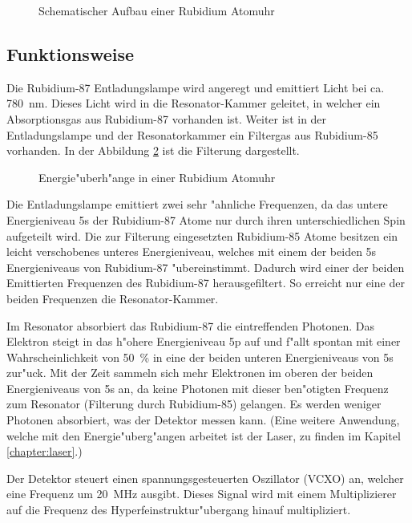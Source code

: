 \begin{refsection}
\begin{figure}
  \centering
  
  \caption{Schematischer Aufbau einer Rubidium Atomuhr}
  \label{fig:techBlock}
\end{figure}

\subsection{Funktionsweise}
Die Rubidium-87 Entladungslampe wird angeregt und emittiert Licht bei
ca. \SI{780}{\nano\meter}.  Dieses Licht wird in die Resonator-Kammer
geleitet, in welcher ein Absorptionsgas aus Rubidium-87 vorhanden ist.
Weiter ist in der Entladungslampe und der Resonatorkammer ein
Filtergas aus Rubidium-85 vorhanden.  In der Abbildung
\ref{fig:uebergaenge} ist die Filterung dargestellt.

\begin{figure}
  \centering
  
  \caption{Energie"uberh"ange in einer Rubidium Atomuhr}
  \label{fig:uebergaenge}
\end{figure}

Die Entladungslampe emittiert zwei sehr "ahnliche Frequenzen, da das
untere Energieniveau 5s der Rubidium-87 Atome nur durch ihren
unterschiedlichen Spin aufgeteilt wird.  Die zur Filterung
eingesetzten Rubidium-85 Atome besitzen ein leicht verschobenes
unteres Energieniveau, welches mit einem der beiden 5s Energieniveaus
von Rubidium-87 "ubereinstimmt.  Dadurch wird einer der beiden
Emittierten Frequenzen des Rubidium-87 herausgefiltert.  So erreicht
nur eine der beiden Frequenzen die Resonator-Kammer.

Im Resonator absorbiert das Rubidium-87 die eintreffenden
Photonen. Das Elektron steigt in das h"ohere Energieniveau 5p auf und
f"allt spontan mit einer Wahrscheinlichkeit von \SI{50}{\percent} in
eine der beiden unteren Energieniveaus von 5s zur"uck.  Mit der Zeit
sammeln sich mehr Elektronen im oberen der beiden Energieniveaus von
5s an, da keine Photonen mit dieser ben"otigten Frequenz zum Resonator
(Filterung durch Rubidium-85) gelangen.  Es werden weniger Photonen
absorbiert, was der Detektor messen kann.  (Eine weitere Anwendung,
welche mit den Energie"uberg"angen arbeitet ist der Laser, zu finden
im Kapitel \ref{chapter:laser}.)

Der Detektor steuert einen spannungsgesteuerten Oszillator (VCXO) an,
welcher eine Frequenz um \SI{20}{\mega\hertz} ausgibt.  Dieses Signal
wird mit einem Multiplizierer auf die Frequenz des
Hyperfeinstruktur"ubergang hinauf multipliziert.


\end{refsection}
